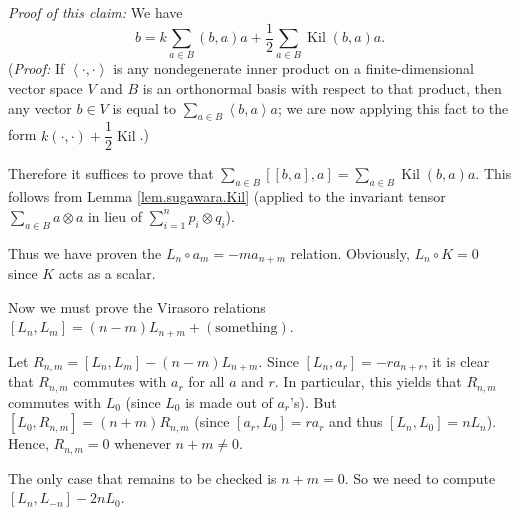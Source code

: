 \documentclass
[numbers=enddot,12pt,final,onecolumn,german,notitlepage]{scrartcl}%
\theoremstyle{definition}
\begin{document}
\textit{Proof of this claim:} We have%
\[
b=k\sum\limits_{a\in B}\left(  b,a\right)  a+\dfrac{1}{2}\sum\limits_{a\in
B}\operatorname*{Kil}\left(  b,a\right)  a.
\]
(\textit{Proof:} If $\left\langle \cdot,\cdot\right\rangle $ is any
nondegenerate inner product on a finite-dimensional vector space $V$ and $B$
is an orthonormal basis with respect to that product, then any vector $b\in V$
is equal to $\sum\limits_{a\in B}\left\langle b,a\right\rangle a$; we are now
applying this fact to the form $k\left(  \cdot,\cdot\right)  +\dfrac{1}%
{2}\operatorname*{Kil}$.)

Therefore it suffices to prove that $\sum\limits_{a\in B}\left[  \left[
b,a\right]  ,a\right]  =\sum\limits_{a\in B}\operatorname*{Kil}\left(
b,a\right)  a$. This follows from Lemma \ref{lem.sugawara.Kil} (applied to the
invariant tensor $\sum\limits_{a\in B}a\otimes a$ in lieu of $\sum
\limits_{i=1}^{n}p_{i}\otimes q_{i}$).

Thus we have proven the $L_{n}\circ a_{m}=-ma_{n+m}$ relation. Obviously,
$L_{n}\circ K=0$ since $K$ acts as a scalar.

Now we must prove the Virasoro relations $\left[  L_{n},L_{m}\right]  =\left(
n-m\right)  L_{n+m}+\left(  \text{something}\right)  $.

Let $R_{n,m}=\left[  L_{n},L_{m}\right]  -\left(  n-m\right)  L_{n+m}$. Since
$\left[  L_{n},a_{r}\right]  =-ra_{n+r}$, it is clear that $R_{n,m}$ commutes
with $a_{r}$ for all $a$ and $r$. In particular, this yields that $R_{n,m}$
commutes with $L_{0}$ (since $L_{0}$ is made out of $a_{r}$'s). But $\left[
L_{0},R_{n,m}\right]  =\left(  n+m\right)  R_{n,m}$ (since $\left[
a_{r},L_{0}\right]  =ra_{r}$ and thus $\left[  L_{n},L_{0}\right]  =nL_{n}$).
Hence, $R_{n,m}=0$ whenever $n+m\neq0$.

The only case that remains to be checked is $n+m=0$. So we need to compute
$\left[  L_{n},L_{-n}\right]  -2nL_{0}$.
\end{document}

